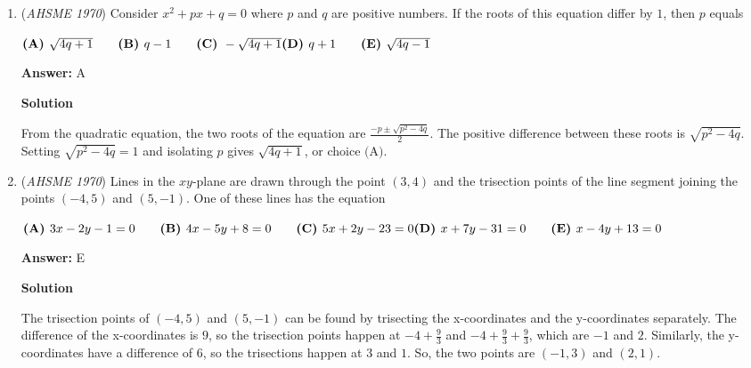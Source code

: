 \begin{enumerate}
 The LHS is $(a^b)^n$.  By the elementary definition of exponentiation, this is $a^b$ multiplied by itself $n$ times.  Since each $a^b$ is actually $a$ multiplied $b$ times, the expression $(a^b)^n$ is $a$ multiplied by itself $bn$ times.  

 The RHS is $a^{bn}$.  This is $a$ multiplied by itself $bn$ times.

 Thus, the LHS is always equal to the RHS, so $\fbox{D}$ is the only correct statement.

 


	\item (\textit{AHSME 1970}) Consider $x^2+px+q=0$ where $p$ and $q$ are positive numbers. If the roots of this equation differ by $1$, then $p$ equals


 $\textbf{(A) }\sqrt{4q+1}\qquad \textbf{(B) }q-1\qquad \textbf{(C) }-\sqrt{4q+1}\qquad\\ \textbf{(D) }q+1\qquad \textbf{(E) }\sqrt{4q-1}$

 \textbf{Answer: }A



\textbf{Solution}

From the quadratic equation, the two roots of the equation are $\frac{-p\pm\sqrt{p^2-4q}}{2}$. The positive difference between these roots is $\sqrt{p^2 - 4q}$. Setting $\sqrt{p^2-4q}=1$ and isolating $p$ gives $\sqrt{4q+1}$, or choice $\boxed{\text{(A)}}$.

 


	\item (\textit{AHSME 1970}) Lines in the $xy$-plane are drawn through the point $(3,4)$ and the trisection points of the line segment 
joining the points $(-4,5)$ and $(5,-1)$. One of these lines has the equation 


 $\textbf{(A) }3x-2y-1=0\qquad \textbf{(B) }4x-5y+8=0\qquad \textbf{(C) }5x+2y-23=0\qquad\\ \textbf{(D) }x+7y-31=0\qquad  \textbf{(E) }x-4y+13=0$

 \textbf{Answer: }E



\textbf{Solution}

The trisection points of $(-4, 5)$ and $(5, -1)$ can be found by trisecting the x-coordinates and the y-coordinates separately.  The difference of the x-coordinates is $9$, so the trisection points happen at $-4 + \frac{9}{3}$ and $-4 + \frac{9}{3} + \frac{9}{3}$, which are $-1$ and $2$.  Similarly, the y-coordinates have a difference of $6$, so the trisections happen at $3$ and $1$.  So, the two points are $(-1, 3)$ and $(2, 1)$.


\end{enumerate}
